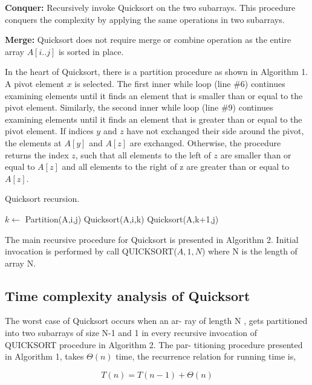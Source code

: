 \documentclass[a4paper, 10pt,twocolumn]{article}
\begin{document}
\textbf{Conquer:} Recursively invoke Quicksort on the two subarrays. This procedure conquers the
complexity by applying the same operations in two subarrays.

\textbf{Merge:} Quicksort does not require merge or combine operation as the entire array $A[i..j]$ is sorted in place.

In the heart of Quicksort, there is a partition
procedure as shown in Algorithm 1. A pivot element $x$ is selected. The first inner while loop (line
\#6) continues examining elements until it finds an
element that is smaller than or equal to the pivot element. Similarly, the second inner while loop (line
\#9) continues examining elements until it finds an
element that is greater than or equal to the pivot
element. If indices $y$ and $z$ have not exchanged
their side around the pivot, the elements at $A[y]$
and $A[z]$ are exchanged. Otherwise, the procedure
returns the index $z$, such that all elements to the
left of $z$ are smaller than or equal to $A[z]$ and all
elements to the right of z are greater than or equal
to $A[z]$.

\begin{algorithm}
\caption{Quicksort recursion.}
\begin{algorithmic}[1]
     \newline
      \newline
	    \State $k \leftarrow$ Partition(A,i,j)
	    \State Quicksort(A,i,k)
	    \State Quicksort(A,k+1,j)
	\EndIf
     \EndProcedure 
  \end{algorithmic}
\end{algorithm}



The main recursive procedure for Quicksort is presented in Algorithm 2. Initial invocation is performed
by call QUICKSORT($A,1,N$) where N is the length of array N.

\subsection{Time complexity analysis of Quicksort}
The worst case of Quicksort occurs when an ar-
ray of length N , gets partitioned into two subarrays
of size N-1 and 1 in every recursive invocation of
QUICKSORT procedure in Algorithm 2. The par-
titioning procedure presented in Algorithm 1, takes
$\Theta(n)$ time, the recurrence relation for running time
is,

	\[T(n)=T(n - 1)+\Theta(n)\]
\end{document}
